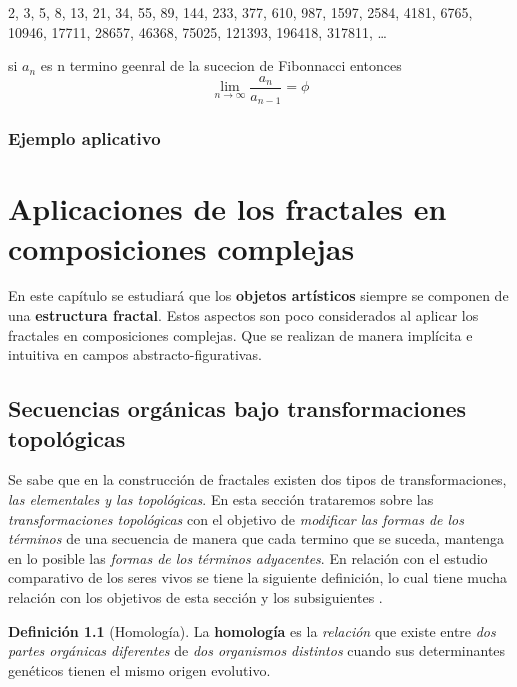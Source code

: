 \documentclass[
  11pt,
]{krantz}
\theoremstyle{definition}
\newtheorem{definition}{Definición}[chapter]
\theoremstyle{definition}
\theoremstyle{definition}
\theoremstyle{definition}
\theoremstyle{remark}
\begin{document}
2, 3, 5, 8, 13, 21, 34, 55, 89, 144, 233, 377, 610, 987, 1597, 2584, 4181, 6765, 10946, 17711, 28657, 46368, 75025, 121393, 196418, 317811, \ldots{}

si \(a_n\) es n termino geenral de la sucecion de Fibonnacci entonces
\[ \lim_{n \to \infty} \frac{a_n}{a_{n-1}}=\phi  \]

\hypertarget{ejemplo-aplicativo}{%
\subsection{Ejemplo aplicativo}\label{ejemplo-aplicativo}}

\hypertarget{aplicaciones-de-los-fractales-en-composiciones-complejas}{%
\chapter{Aplicaciones de los fractales en composiciones complejas}\label{aplicaciones-de-los-fractales-en-composiciones-complejas}}

En este capítulo se estudiará que los \textbf{objetos artísticos} siempre se componen de una \textbf{estructura fractal}. Estos aspectos son poco considerados al aplicar los fractales en composiciones complejas. Que se realizan de manera implícita e intuitiva en campos abstracto-figurativas.

\hypertarget{secuencias-orguxe1nicas-bajo-transformaciones-topoluxf3gicas}{%
\section{Secuencias orgánicas bajo transformaciones topológicas}\label{secuencias-orguxe1nicas-bajo-transformaciones-topoluxf3gicas}}

Se sabe que en la construcción de fractales existen dos tipos de transformaciones, \emph{las elementales y las topológicas}. En esta sección trataremos sobre las \emph{transformaciones topológicas} con el objetivo de \emph{modificar las formas de los términos} de una secuencia de manera que cada termino que se suceda, mantenga en lo posible las \emph{formas de los términos adyacentes}. En relación con el estudio comparativo de los seres vivos se tiene la siguiente definición, lo cual tiene mucha relación con los objetivos de esta sección y los subsiguientes \citet{homology}.

\begin{definition}[Homología]
\protect\hypertarget{def:homologia}{}\label{def:homologia}La \textbf{homología} es la \emph{relación} que existe entre \emph{dos partes orgánicas diferentes} de \emph{dos organismos distintos} cuando sus determinantes genéticos tienen el mismo origen evolutivo.
\end{definition}
\end{document}
